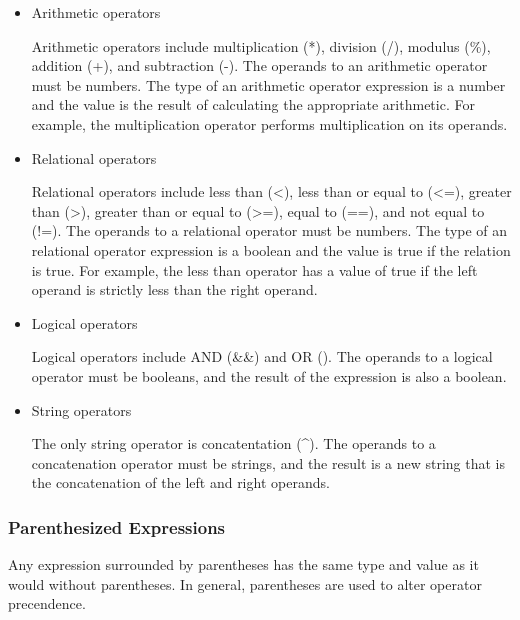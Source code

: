 \documentclass[oneside]{book}
\begin{document}
\begin{itemize}
\item Arithmetic operators

Arithmetic operators include multiplication (*), division (/), modulus (\%), addition (+), and subtraction (-). The operands to an arithmetic operator must be numbers. The type of an arithmetic operator expression is a number and the value is the result of calculating the appropriate arithmetic. For example, the multiplication operator performs multiplication on its operands.

\item Relational operators

Relational operators include less than (\textless), less than or equal to (\textless=), greater than (\textgreater), greater than or equal to (\textgreater=), equal to (==), and not equal to (!=). The operands to a relational operator must be numbers. The type of an relational operator expression is a boolean and the value is true if the relation is true. For example, the less than operator has a value of true if the left operand is strictly less than the right operand.

\item Logical operators

Logical operators include AND (\&\&) and OR (\textbar\textbar). The operands to a logical operator must be booleans, and the result of the expression is also a boolean.

\item String operators

The only string operator is concatentation (\textasciicircum). The operands to a concatenation operator must be strings, and the result is a new string that is the concatenation of the left and right operands.

\end{itemize}

\subsubsection{Parenthesized Expressions}

Any expression surrounded by parentheses has the same type and value as it would without parentheses. In general, parentheses are used to alter operator precendence.
\end{document}
